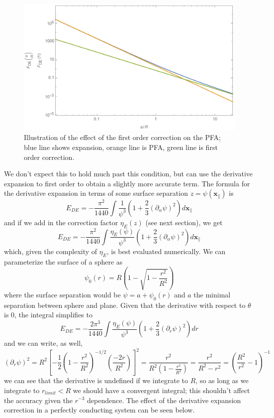 \documentclass[11pt,traditabstract]{article}
\begin{document}
\begin{figure}[h]
\centering
\includegraphics[width=5in]{PFAExpansion}
\caption{Illustration of the effect of the first order correction on the PFA; blue line shows expansion, orange line is PFA, green line is first order correction.}\label{fig:expansion}
\end{figure}

We don't expect this to hold much past this condition, but can use the derivative expansion to first order to obtain a slightly more accurate term. The formula for the derivative expansion in terms of some surface separation $z=\psi(\mathbf{x}_\parallel)$ is
$$
E_{DE}=-\frac{\pi^2}{1440}\int\frac{1}{\psi^3}\left(1+\frac{2}{3}(\partial_\alpha \psi)^2\right)d\mathbf{x}_\parallel
$$
and if we add in the correction factor $\eta_E(z)$ (see next section), we get
$$
E_{DE}=-\frac{\pi^2}{1440}\int\frac{\eta_E(\psi)}{\psi^3}\left(1+\frac{2}{3}(\partial_\alpha \psi)^2\right)d\mathbf{x}_\parallel
$$
which, given the complexity of $\eta_E$, is best evaluated numerically. We can parameterize the surface of a sphere as
$$
\psi_0(r)=R\left(1-\sqrt{1-\frac{r^2}{R^2}}\right)
$$
where the surface separation would be $\psi=a+\psi_0(r)$ and $a$ the minimal separation between sphere and plane. Given that the derivative with respect to $\theta$ is 0, the integral simplifies to
$$
E_{DE}=-\frac{2\pi^3}{1440}\int\frac{\eta_E(\psi)}{\psi^3}\left(1+\frac{2}{3}(\partial_r \psi)^2\right)dr
$$
and we can write, as well, 
$$
(\partial_r\psi)^2=R^2\left[-\frac{1}{2}\left(1-\frac{r^2}{R^2}\right)^{-1/2}\left(\frac{-2r}{R^2}\right)\right]^2=\frac{r^2}{R^2(1-\frac{r^2}{R^2})}=\frac{r^2}{R^2-r^2}=\left(\frac{R^2}{r^2}-1\right)^{-1}
$$
we can see that the derivative is undefined if we integrate to $R$, so as long as we integrate to $r_{limit}<R$ we should have a convergent integral; this shouldn't affect the accuracy given the $r^{-3}$ dependence. The effect of the derivative expansion correction in a perfectly conducting system can be seen below.
\end{document}
